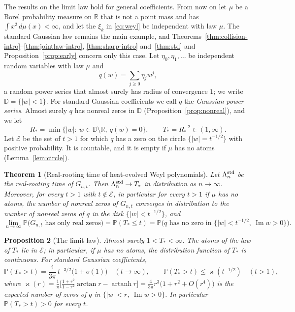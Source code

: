 \documentclass[11pt]{amsart}
\newtheorem{theorem}{Theorem}[section]
\newtheorem{proposition}[theorem]{Proposition}
\theoremstyle{definition}
\theoremstyle{remark}
\numberwithin{equation}{section}
\newcommand{\R}{\mathbb{R}}
\newcommand{\D}{\mathbb{D}}
\newcommand{\PP}{\mathbb{P}}
\DeclareMathOperator{\im}{Im}
\begin{document}
The results on the limit law hold for general coefficients. From now on let $\mu$ be a Borel probability measure on $\R$ that is not a point mass and has $\int x^2\,d\mu(x)<\infty$, and let the $\xi_k$ in \eqref{eq:weyl} be independent with law $\mu$. The standard Gaussian law remains the main example, and Theorems~\ref{thm:collision-intro}--\ref{thm:jointlaw-intro}, \ref{thm:sharp-intro} and~\ref{thm:std} and Proposition~\ref{prop:early} concern only this case. Let $\eta_0,\eta_1,\dots$ be independent random variables with law $\mu$ and
\begin{equation}\label{eq:kac}
q(w)=\sum_{j\ge0}\eta_jw^j ,
\end{equation}
a random power series that almost surely has radius of convergence $1$; we write $\D=\{|w|<1\}$. For standard Gaussian coefficients we call $q$ the \emph{Gaussian power series}. Almost surely $q$ has nonreal zeros in $\D$ (Proposition~\ref{prop:nonreal}), and we let
\begin{equation}\label{eq:Rstar}
R_*=\min\{|w|:\ w\in\D\setminus\R,\ q(w)=0\},\qquad T_*=R_*^{-2}\in(1,\infty).
\end{equation}
Let $\mathcal E$ be the set of $t>1$ for which $q$ has a zero on the circle $\{|w|=t^{-1/2}\}$ with positive probability. It is countable, and it is empty if $\mu$ has no atoms (Lemma~\ref{lem:circle}).

\begin{theorem}[Real-rooting time of heat-evolved Weyl polynomials]\label{cor:weyl}
Let $\Lambda_n^{\rm std}$ be the real-rooting time of $G_{n,t}$. Then $\Lambda_n^{\rm std}\to T_*$ in distribution as $n\to\infty$. Moreover, for every $t>1$ with $t\notin\mathcal E$, in particular for every $t>1$ if $\mu$ has no atoms, the number of nonreal zeros of $G_{n,t}$ converges in distribution to the number of nonreal zeros of $q$ in the disk $\{|w|<t^{-1/2}\}$, and
\[
\lim_{n\to\infty}\PP\bigl(G_{n,t}\text{ has only real zeros}\bigr)=\PP(T_*\le t)=\PP\bigl(q\text{ has no zero in }\{|w|<t^{-1/2},\ \im w>0\}\bigr).
\]
\end{theorem}

\begin{proposition}[The limit law]\label{prop:law}
Almost surely $1<T_*<\infty$. The atoms of the law of $T_*$ lie in $\mathcal E$; in particular, if $\mu$ has no atoms, the distribution function of $T_*$ is continuous. For standard Gaussian coefficients,
\[
\PP(T_*>t)=\frac4{3\pi}\,t^{-3/2}\bigl(1+o(1)\bigr)\quad(t\to\infty),\qquad\PP(T_*>t)\le\varkappa(t^{-1/2})\quad(t>1),
\]
where $\varkappa(r)=\frac1\pi\bigl[\frac{1+r^2}{1-r^2}\arctan r-\operatorname{artanh}r\bigr]=\frac4{3\pi}r^3\bigl(1+r^2+O(r^4)\bigr)$ is the expected number of zeros of $q$ in $\{|w|<r,\ \im w>0\}$. In particular $\PP(T_*>t)>0$ for every $t$.
\end{proposition}
\end{document}
